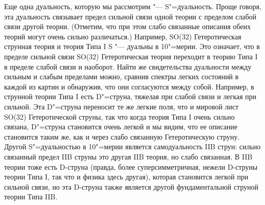Еще одна дуальность, которую мы рассмотрим "--- S"=дуальность.
Проще говоря, эта дуальность связывает предел сильной связи одной теории с пределом слабой связи другой теории.
(Отметим, что при этом слабо связанные описания обеих теорий могут очень сильно различаться.)
Например, SO(32) Гетеротическая струнная теория и теория Типа I S "--- дуальны в 10"=мерии.
Это означает, что в пределе сильной связи SO(32) Гетеротическая теория переходит в теорию Типа I в пределе слабой связи и наоборот.
Найти же свидетельства дуальности между сильным и слабым пределами можно, сравнив спектры легких состояний в каждой из картин и обнаружив, что они согласуются между собой.
Например, в струнной теории Типа I есть D"=струна, тяжелая при слабой связи и легкая при сильной.
Эта D"=струна переносит те же легкие поля, что и мировой лист SO(32) Гетеротической струны, так что когда теория Типа I очень сильно связана,
D"=струна становится очень легкой и мы видим, что ее описание становится таким же, как и через слабо связанную Гетеротическую струну.
Другой S"=дуальностью в 10"=мерии является самодуальность IIB струн: сильно связанный предел IIB струны это другая IIB теория, но слабо связанная.
В IIB теории тоже есть D-струна (правда, более суперсимметричная, нежели D-струны теории Типа I, так что и физика здесь другая),
которая становится легкой при сильной связи, но эта D-струна также является другой фундаментальной струной теории Типа IIB.